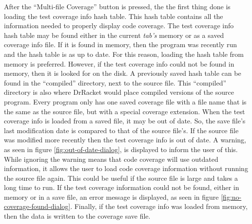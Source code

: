 After the ``Multi-file Coverage'' button is pressed, the the first thing done is loading the test coverage info hash table. This hash table contains all the information needed to properly display code coverage. The test coverage info hash table may be found either in the current \emph{tab's} memory or as a saved coverage info file. If it is found in memory, then the program was recently run and the hash table is as up to date. For this reason, loading the hash table from memory is preferred. However, if the test coverage info could not be found in memory, then it is looked for on the disk. A previously saved hash table can be found in the ``compiled'' directory, next to the source file. This ``compiled'' directory is also where DrRacket would place compiled versions of the source program. Every program only has one saved coverage file with a file name that is the same as the source file, but with a special coverage extension. When the test coverage info is loaded from a saved file, it may be out of date. So, the save file's last modification date is compared to that of the source file's. If the source file was modified more recently then the test coverage info is out of date. A warning, as seen in figure \ref{fig:out-of-date-dialog}, is displayed to inform the user of this. While ignoring the warning means that code coverage will use outdated information, it allows the user to load code coverage information without running the source file again. This could be useful if the source file is large and takes a long time to run. If the test coverage information could not be found, either in memory or in a save file, an error message is displayed, as seen in figure \ref{fig:no-coverage-found-dialog}. Finally, if the test coverage info was loaded from memory, then the data is written to the coverage save file.



